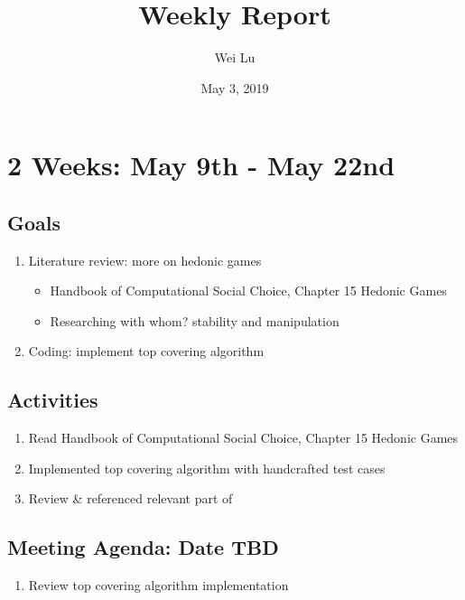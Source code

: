 \documentclass[a4paper]{article}
\title{Weekly Report}
\date{May 3, 2019}
\author{Wei Lu}
\begin{document}
\maketitle

\section*{2 Weeks: May 9th - May 22nd}

\subsection*{Goals}

\begin{enumerate}
  \item Literature review: more on hedonic games
  \begin{itemize}
    \item Handbook of Computational Social Choice, Chapter 15 Hedonic Games \cite{aziz_savani_moulin_2016}
    \item Researching with whom? stability and manipulation \cite{ALCALDE2004869}
  \end{itemize}

  \item Coding: implement top covering algorithm

\end{enumerate}

\subsection*{Activities}

\begin{enumerate}
  \item Read Handbook of Computational Social Choice, Chapter 15 Hedonic Games \cite{aziz_savani_moulin_2016}
  \item Implemented top covering algorithm with handcrafted test cases
  \item Review \& referenced relevant part of \cite{ALCALDE2004869}
\end{enumerate}

\subsection*{Meeting Agenda: Date TBD}

\begin{enumerate}
  \item Review top covering algorithm implementation
\end{enumerate}
\end{document}
